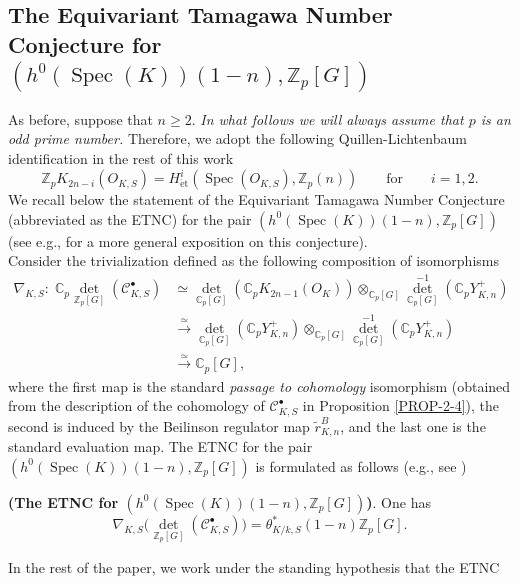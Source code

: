 \documentclass[a4paper,11pt]{article}
\newenvironment{conjecture}[1][Conjecture]{\begin{trivlist}
\item[\hskip \labelsep {\bfseries #1}]}{\end{trivlist}}
\begin{document}
\subsection{The Equivariant Tamagawa Number Conjecture for $(h^0(\operatorname{Spec}(K))(1-n), \mathbb Z_p[G])$}\label{ETNCnegative-weight}
As before, suppose that $n\geq 2$.
\textit{In what follows we will always assume that $p$ is an odd prime number.} 
Therefore, we adopt  the following Quillen-Lichtenbaum identification in the rest of this work
\[
\mathbb Z_pK_{2n-i}(O_{K,S})
=
H^i_{\mathrm{\acute{e}t}}(\operatorname{Spec}(O_{K,S}),\mathbb Z_p(n))\qquad \text{for}\qquad i=1,2.
\]
\noindent We recall below the statement of the Equivariant Tamagawa Number Conjecture (abbreviated as the ETNC) for the pair $(h^0(\operatorname{Spec}(K))(1-n), \mathbb Z_p[G])$ (see e.g., \cite{Flach} for a more general exposition on this conjecture).\\
Consider the  trivialization defined as the following composition of isomorphisms
\begin{align}\label{Trivialization}
\nabla_{K,S}:\;\mathbb{C}_p\operatorname{det}_{\mathbb{Z}_p[G]}(\mathcal{C}^\bullet_{K,S})&\simeq \operatorname{det}_{\mathbb{C}_p[G]}(\mathbb{C}_pK_{2n-1}(O_{K}))\otimes_{\mathbb{C}_p[G]}\operatorname{det}^{-1}_{\mathbb{C}_p[G]}(\mathbb{C}_pY_{K,n}^+) \nonumber\\
    &\stackrel{\simeq}{\longrightarrow}\operatorname{det}_{\mathbb{C}_p[G]}(\mathbb{C}_pY_{K,n}^+)\otimes_{\mathbb{C}_p[G]}\operatorname{det}^{-1}_{\mathbb{C}_p[G]}(\mathbb{C}_pY_{K,n}^+) \nonumber\\
    &\stackrel{\simeq}{\longrightarrow}\mathbb{C}_p[G],
\end{align}
where the first map is the standard \textit{passage to cohomology} isomorphism (obtained from the description of the cohomology of $\mathcal{C}_{K,S}^\bullet$ in Proposition \ref{PROP-2-4}), the second is induced by the Beilinson regulator map $\widetilde r^B_{K,n}$, and the last one is the standard evaluation map.
The ETNC for the pair $(h^0(\operatorname{Spec}(K))(1-n), \mathbb Z_p[G])$ is formulated as follows (e.g., see \cite[\S 3]{BunsG1})
\begin{conjecture}{\textbf{(The ETNC for $(h^0(\operatorname{Spec}(K))(1-n), \mathbb Z_p[G])$)}.}\label{ConjectETNC} One has
\[\nabla_{K,S}\bigl(\operatorname{det}_{\mathbb Z_p[G]}(\mathcal C^\bullet_{K,S})\bigr)=\theta^{*}_{K/k,S}(1-n)\mathbb{Z}_p[G].
\]
\end{conjecture}
In the rest of the paper, we work under the standing hypothesis that the ETNC
\end{document}
